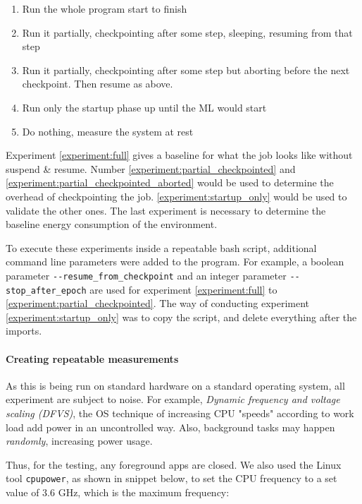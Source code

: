 \begin{enumerate}
    \item \label{experiment:full}Run the whole program start to finish
    \item \label{experiment:partial_checkpointed}Run it partially, checkpointing after some step, sleeping, resuming from that step
    \item \label{experiment:partial_checkpointed_aborted}Run it partially, checkpointing after some step but aborting before the next checkpoint. Then resume as above.
    \item \label{experiment:startup_only}Run only the startup phase up until the ML would start
    \item \label{experiment:baseline}Do nothing, measure the system at rest
\end{enumerate}

Experiment \ref{experiment:full} gives a baseline for what the job looks like without suspend \& resume. Number \ref{experiment:partial_checkpointed} and \ref{experiment:partial_checkpointed_aborted} would be used to determine the overhead of checkpointing the job. \ref{experiment:startup_only} would be used to validate the other ones. The last experiment is necessary to determine the baseline energy consumption of the environment.

To execute these experiments inside a repeatable bash script, additional command line parameters were added to the program. 
For example, a boolean parameter \verb|--resume_from_checkpoint| and an integer parameter \verb|--stop_after_epoch| are used for experiment \ref{experiment:full} to \ref{experiment:partial_checkpointed}. 
The way of conducting experiment \ref{experiment:startup_only} was to copy the script, and delete everything after the imports.

\paragraph{Creating repeatable measurements}

As this is being run on standard hardware on a standard operating system, all experiment are subject to noise. 
For example, \emph{Dynamic frequency and voltage scaling (DFVS)}, the OS technique of increasing CPU "speeds" according to work load add power in an uncontrolled way. Also, background tasks may happen \emph{randomly}, increasing power usage. 

Thus, for the testing, any foreground apps are closed. We also used the Linux tool \verb|cpupower|, as shown in snippet below, to set the CPU frequency to a set value of 3.6 GHz, which is the maximum frequency:


